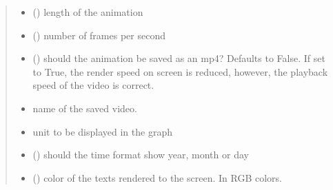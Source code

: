 \documentclass[letterpaper,10pt,english]{sphinxmanual}
\begin{document}
\begin{fulllineitems}
\begin{quote}
\begin{description}
\begin{itemize}
\item {} 
\sphinxAtStartPar
{} () \textendash{} length of the animation

\item {} 
\sphinxAtStartPar
{} () \textendash{} number of frames per second

\item {} 
\sphinxAtStartPar
{} () \textendash{} should the animation be saved as an mp4? Defaults to False. If set to True, the render speed on screen is reduced, however, the playback speed of the video is correct.

\item {} 
\sphinxAtStartPar
{} \textendash{} name of the saved video.

\item {} 
\sphinxAtStartPar
{} \textendash{} unit to be displayed in the graph

\item {} 
\sphinxAtStartPar
{} (\sphinxstyleliteralemphasis{\sphinxupquote{, }}\sphinxstyleliteralemphasis{\sphinxupquote{, }}) \textendash{} should the time format show year, month or day

\item {} 
\sphinxAtStartPar
{} (\sphinxstyleliteralemphasis{\sphinxupquote{ (}}\sphinxstyleliteralemphasis{\sphinxupquote{, }}\sphinxstyleliteralemphasis{\sphinxupquote{, }}\sphinxstyleliteralemphasis{\sphinxupquote{)}}) \textendash{} color of the texts rendered to the screen. In RGB colors.


\end{itemize}
\end{description}
\end{quote}
\end{fulllineitems}
\end{document}
